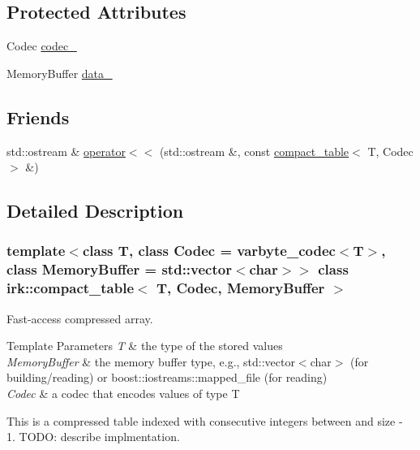 \subsection*{Protected Attributes}
\begin{DoxyCompactItemize}
\item 
Codec \mbox{\hyperlink{classirk_1_1compact__table_aeac5fcd509fae2f16e455fc6a37eb1d3}{codec\+\_\+}}
\item 
Memory\+Buffer \mbox{\hyperlink{classirk_1_1compact__table_a8a8f2eccb0ccc0258c158c51dfbfdbaa}{data\+\_\+}}
\end{DoxyCompactItemize}
\subsection*{Friends}
\begin{DoxyCompactItemize}
\item 
std\+::ostream \& \mbox{\hyperlink{classirk_1_1compact__table_aabbde77b5cb5faeef5fe72eff9624aa5}{operator$<$$<$}} (std\+::ostream \&, const \mbox{\hyperlink{classirk_1_1compact__table}{compact\+\_\+table}}$<$ T, Codec $>$ \&)
\end{DoxyCompactItemize}


\subsection{Detailed Description}
\subsubsection*{template$<$class T, class Codec = varbyte\+\_\+codec$<$\+T$>$, class Memory\+Buffer = std\+::vector$<$char$>$$>$\newline
class irk\+::compact\+\_\+table$<$ T, Codec, Memory\+Buffer $>$}

Fast-\/access compressed array. 


\begin{DoxyTemplParams}{Template Parameters}
{\em T} & the type of the stored values \\
\hline
{\em Memory\+Buffer} & the memory buffer type, e.\+g., {\ttfamily std\+::vector$<$char$>$} (for building/reading) or {\ttfamily boost\+::iostreams\+::mapped\+\_\+file} (for reading) \\
\hline
{\em Codec} & a codec that encodes values of type {\ttfamily T}\\
\hline
\end{DoxyTemplParams}
This is a compressed table indexed with consecutive integers between {} and {\ttfamily size -\/ 1}. T\+O\+DO\+: describe implmentation.


